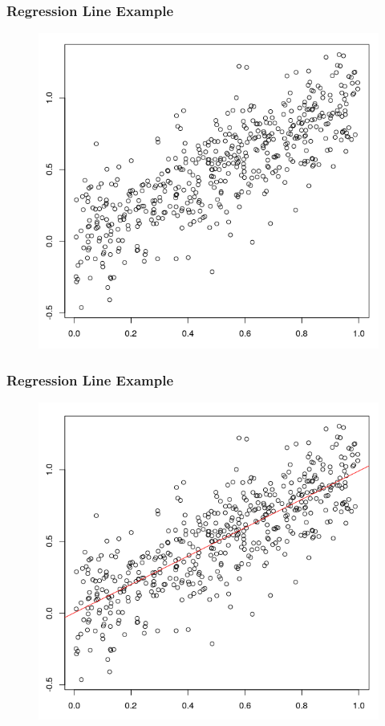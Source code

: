 \documentclass[xcolor=dvipsnames]{beamer}
\begin{document}
\begin{frame}
  \frametitle{Regression Line Example}
  \begin{figure}[h]
    \includegraphics[scale=0.4]{./diagrams/abline1.png}
  \end{figure}
\end{frame}

\begin{frame}
  \frametitle{Regression Line Example}
  \begin{figure}[h]
    \includegraphics[scale=0.4]{./diagrams/abline2.png}
  \end{figure}
\end{frame}
\end{document}
